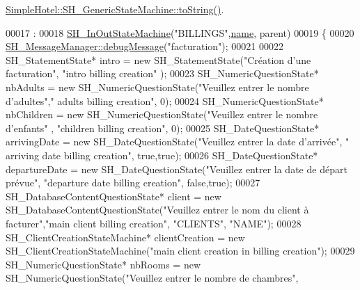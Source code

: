 \hyperlink{classSimpleHotel_1_1SH__GenericStateMachine_ad6dd1d0986c40684410ed94f1f610b12}{Simple\-Hotel\-::\-S\-H\-\_\-\-Generic\-State\-Machine\-::to\-String()}.


\begin{DoxyCode}
00017                                                                                             :
00018     \hyperlink{classSimpleHotel_1_1SH__InOutStateMachine_af725c1a19c2b13b7f07f3966e632a00b}{SH\_InOutStateMachine}(\textcolor{stringliteral}{"BILLINGS"},\hyperlink{classSimpleHotel_1_1SH__NamedObject_ad144716345034c91cface8f3163a799e}{name}, parent)
00019 \{
00020      \hyperlink{classSimpleHotel_1_1SH__MessageManager_ad680f823897b7bf70e46ee18326c08b2}{SH\_MessageManager::debugMessage}(\textcolor{stringliteral}{"facturation"});
00021 
00022     SH\_StatementState* intro = \textcolor{keyword}{new} SH\_StatementState(\textcolor{stringliteral}{"Création d'une facturation"}, \textcolor{stringliteral}{"intro billing creation"}
      );
00023     SH\_NumericQuestionState* nbAdults = \textcolor{keyword}{new} SH\_NumericQuestionState(\textcolor{stringliteral}{"Veuillez entrer le nombre d'adultes"},\textcolor{stringliteral}{"
      adults billing creation"}, 0);
00024     SH\_NumericQuestionState* nbChildren = \textcolor{keyword}{new} SH\_NumericQuestionState(\textcolor{stringliteral}{"Veuillez entrer le nombre d'enfants"}
      , \textcolor{stringliteral}{"children billing creation"}, 0);
00025     SH\_DateQuestionState* arrivingDate = \textcolor{keyword}{new} SH\_DateQuestionState(\textcolor{stringliteral}{"Veuillez entrer la date d'arrivée"}, \textcolor{stringliteral}{"
      arriving date billing creation"}, \textcolor{keyword}{true},\textcolor{keyword}{true});
00026     SH\_DateQuestionState* departureDate = \textcolor{keyword}{new} SH\_DateQuestionState(\textcolor{stringliteral}{"Veuillez entrer la date de départ
       prévue"}, \textcolor{stringliteral}{"departure date billing creation"}, \textcolor{keyword}{false},\textcolor{keyword}{true});
00027     SH\_DatabaseContentQuestionState* client = \textcolor{keyword}{new} SH\_DatabaseContentQuestionState(\textcolor{stringliteral}{"Veuillez entrer le nom
       du client à facturer"},\textcolor{stringliteral}{"main client billing creation"}, \textcolor{stringliteral}{"CLIENTS"}, \textcolor{stringliteral}{"NAME"});
00028     SH\_ClientCreationStateMachine* clientCreation = \textcolor{keyword}{new} SH\_ClientCreationStateMachine(\textcolor{stringliteral}{"main client creation
       in billing creation"});
00029     SH\_NumericQuestionState* nbRooms = \textcolor{keyword}{new} SH\_NumericQuestionState(\textcolor{stringliteral}{"Veuillez entrer le nombre de chambres"},

\end{DoxyCode}
